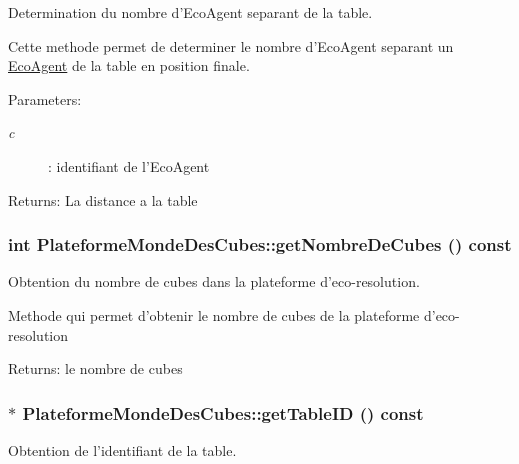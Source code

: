 Determination du nombre d'EcoAgent separant de la table. 

Cette methode permet de determiner le nombre d'EcoAgent separant un \hyperlink{classEcoAgent}{EcoAgent} de la table en position finale.

\begin{Desc}
\item[Parameters:]
\begin{description}
\item[{\em c}]: identifiant de l'EcoAgent \end{description}
\end{Desc}
\begin{Desc}
\item[Returns:]La distance a la table \end{Desc}
\hypertarget{classPlateformeMondeDesCubes_a341731830c30c695d5ef80c90377165}{
\subsubsection[{getNombreDeCubes}]{\setlength{\rightskip}{0pt plus 5cm}int PlateformeMondeDesCubes::getNombreDeCubes () const}}
\label{classPlateformeMondeDesCubes_a341731830c30c695d5ef80c90377165}


Obtention du nombre de cubes dans la plateforme d'eco-resolution. 

Methode qui permet d'obtenir le nombre de cubes de la plateforme d'eco-resolution

\begin{Desc}
\item[Returns:]le nombre de cubes \end{Desc}
\hypertarget{classPlateformeMondeDesCubes_232d0a6c6cbd1bc2d8622fa92dd64ce1}{
\subsubsection[{getTableID}]{ $\ast$ PlateformeMondeDesCubes::getTableID () const}}
\label{classPlateformeMondeDesCubes_232d0a6c6cbd1bc2d8622fa92dd64ce1}


Obtention de l'identifiant de la table. 

